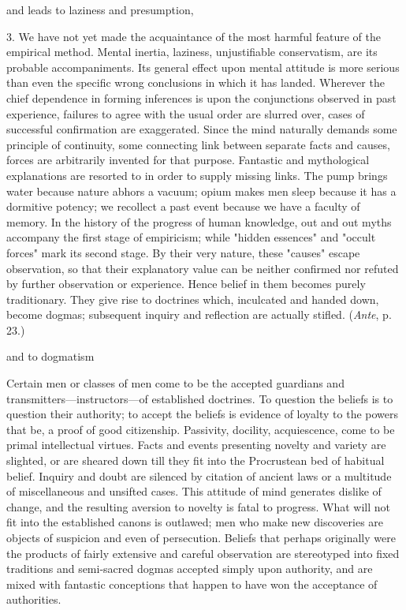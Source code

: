 \documentclass[letterpaper]{book}
\begin{document}
and leads to laziness and presumption,

3. We have not yet made the acquaintance of the most harmful feature of
the empirical method. Mental inertia, laziness, unjustifiable
conservatism, are its probable accompaniments. Its general effect upon
mental attitude is more serious than even the specific wrong conclusions
in which it has landed. Wherever the chief dependence in forming
inferences is upon the conjunctions observed in past experience,
failures to agree with the usual order are slurred over, cases of
successful confirmation are exaggerated. Since the mind naturally
demands some principle of continuity, some connecting link between
separate facts and causes, forces are arbitrarily invented for that
purpose. Fantastic and mythological explanations are resorted to in
order to supply missing links. The pump brings water because nature
abhors a vacuum; opium makes men sleep because it has a
dormitive
potency; we recollect a past event because we have a faculty of memory.
In the history of the progress of human knowledge, out and out myths
accompany the first stage of empiricism; while "hidden essences" and
"occult forces" mark its second stage. By their very nature, these
"causes" escape observation, so that their explanatory value can be
neither confirmed nor refuted by further observation or experience.
Hence belief in them becomes purely traditionary. They give rise to
doctrines which, inculcated and handed down, become dogmas; subsequent
inquiry and reflection are actually stifled. (\emph{Ante}, p. 23.)



and to dogmatism

Certain men or classes of men come to be the accepted guardians and
transmitters---instructors---of established doctrines. To question the
beliefs is to question their authority; to accept the beliefs is
evidence of loyalty to the powers that be, a proof of good citizenship.
Passivity, docility, acquiescence, come to be primal intellectual
virtues. Facts and events presenting novelty and variety are slighted,
or are sheared down till they fit into the Procrustean bed of habitual
belief. Inquiry and doubt are silenced by citation of ancient laws or a
multitude of miscellaneous and unsifted cases. This attitude of mind
generates dislike of change, and the resulting aversion to novelty is
fatal to progress. What will not fit into the established canons is
outlawed; men who make new discoveries are objects of suspicion and even
of persecution. Beliefs that perhaps originally were the products of
fairly extensive and careful observation are stereotyped into fixed
traditions and semi-sacred dogmas accepted simply upon authority, and
are mixed with fantastic conceptions that happen to have won the
acceptance of
authorities.
\end{document}
